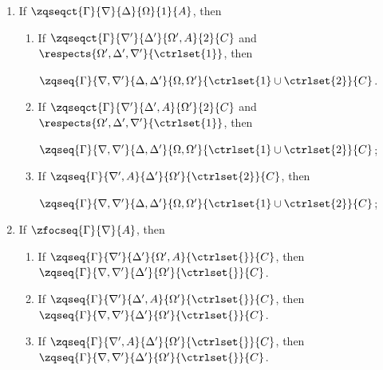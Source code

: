 \begin{theorem}
  \begin{enumerate}
  \item If $\zqseqct{\Gamma}{\nabla}{\Delta}{\Omega}{1}{A}$, then
    \begin{enumerate}
    \item If $\zqseqct{\Gamma}{\nabla'}{\Delta'}{\Omega', A}{2}{C}$ and
      $\respects{\Omega', \Delta', \nabla'}{\ctrlset{1}}$, then

      $\zqseq{\Gamma}{\nabla, \nabla'}{\Delta, \Delta'}{\Omega, \Omega'}{
        \ctrlset{1} \cup \ctrlset{2}}{C}$.
    \item If $\zqseqct{\Gamma}{\nabla'}{\Delta', A}{\Omega'}{2}{C}$ and
      $\respects{\Omega', \Delta', \nabla'}{\ctrlset{1}}$, then

      $\zqseq{\Gamma}{\nabla,\nabla'}{\Delta, \Delta'}{\Omega, \Omega'}{
        \ctrlset{1} \cup \ctrlset{2}}{C}$;

    \item If $\zqseq{\Gamma}{\nabla', A}{\Delta'}{\Omega'}{\ctrlset{2}}{C}$, then

      $\zqseq{\Gamma}{\nabla,\nabla'}{\Delta, \Delta'}{\Omega, \Omega'}{
        \ctrlset{1} \cup \ctrlset{2}}{C}$;

    \end{enumerate}

  \item If $\zfocseq{\Gamma}{\nabla}{A}$, then
    \begin{enumerate}
    \item If $\zqseq{\Gamma}{\nabla'}{\Delta'}{\Omega', A}{\ctrlset{}}{C}$, then
      $\zqseq{\Gamma}{\nabla, \nabla'}{\Delta'}{\Omega'}{\ctrlset{}}{C}$.
    \item If $\zqseq{\Gamma}{\nabla'}{\Delta', A}{\Omega'}{\ctrlset{}}{C}$, then
      $\zqseq{\Gamma}{\nabla, \nabla'}{\Delta'}{\Omega'}{\ctrlset{}}{C}$.
    \item If $\zqseq{\Gamma}{\nabla', A}{\Delta'}{\Omega'}{\ctrlset{}}{C}$, then
      $\zqseq{\Gamma}{\nabla, \nabla'}{\Delta'}{\Omega'}{\ctrlset{}}{C}$.
    \end{enumerate}


  \end{enumerate}
\end{theorem}
